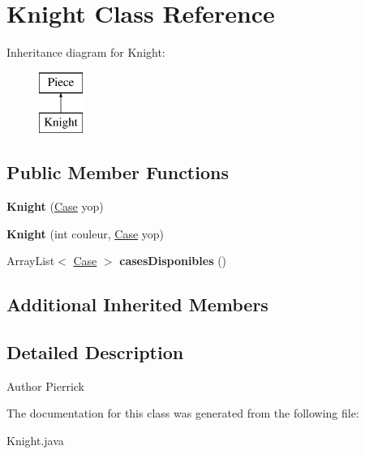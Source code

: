 \hypertarget{class_knight}{}\section{Knight Class Reference}
\label{class_knight}
Inheritance diagram for Knight\+:\begin{figure}[H]
\begin{center}
\leavevmode
\includegraphics[height=2.000000cm]{class_knight}
\end{center}
\end{figure}
\subsection*{Public Member Functions}
\begin{DoxyCompactItemize}
\item 
{\bfseries Knight} (\hyperlink{class_case}{Case} yop)\hypertarget{class_knight_a6e7b3f713650528950fd360c9b1b338a}{}\label{class_knight_a6e7b3f713650528950fd360c9b1b338a}

\item 
{\bfseries Knight} (int couleur, \hyperlink{class_case}{Case} yop)\hypertarget{class_knight_afee7a5f9bcb1ee7029b5e0e8415c14c9}{}\label{class_knight_afee7a5f9bcb1ee7029b5e0e8415c14c9}

\item 
Array\+List$<$ \hyperlink{class_case}{Case} $>$ {\bfseries cases\+Disponibles} ()\hypertarget{class_knight_a017b56f82bf9cee77a16c9f3e1f1e24d}{}\label{class_knight_a017b56f82bf9cee77a16c9f3e1f1e24d}

\end{DoxyCompactItemize}
\subsection*{Additional Inherited Members}


\subsection{Detailed Description}
\begin{DoxyAuthor}{Author}
Pierrick 
\end{DoxyAuthor}


The documentation for this class was generated from the following file\+:\begin{DoxyCompactItemize}
\item 
Knight.\+java\end{DoxyCompactItemize}
